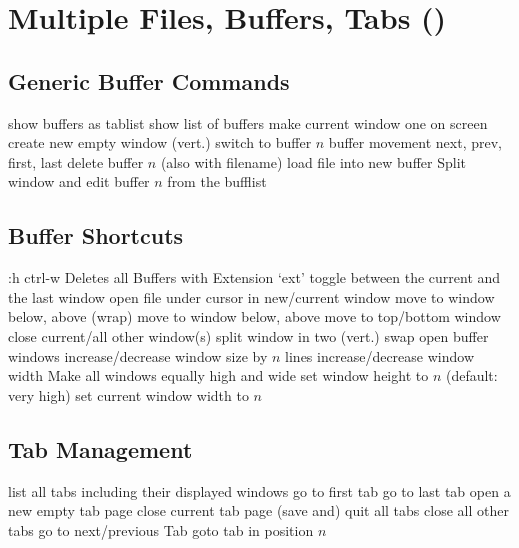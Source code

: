 \section{Multiple Files, Buffers, Tabs (\enter)}	{}
\subsection{Generic Buffer Commands}	{}
	{show buffers as tablist}
	{show list of buffers}
	{make current window one on screen}
	{create new empty window (vert.)}
	{switch to buffer $n$}
	{buffer movement next, prev, first, last}
	{delete buffer $n$ (also with filename)}
	{load file into new buffer}
	{Split window and edit buffer $n$ from the bufflist}

\subsection{Buffer Shortcuts}	{:h ctrl-w }
	{Deletes all Buffers with Extension `ext'}
\cmdS{\ctrl \^{} }	{toggle between the current and the last window}
	{open file under cursor in new/current window}
	{move to window below, above (wrap)}
	{move to window below, above}
	{move to top/bottom window}
	{close current/all other window(s)}
	{split window in two (vert.)}
	{swap open buffer windows }
	{increase/decrease window size by $n$ lines}
	{increase/decrease window width}
	{Make all windows equally high and wide}
	{set window height to $n$ (default: very high) }
	{set current window width to $n$ }

\subsection{Tab Management}	{}
	{list all tabs including their displayed windows}
	{go to first tab}
	{go to last tab}
	{open a new empty tab page}
	{close current tab page}
	{(save and) quit all tabs}
	{close all other tabs}
	{go to next/previous Tab}
	{goto tab in position $n$ }

